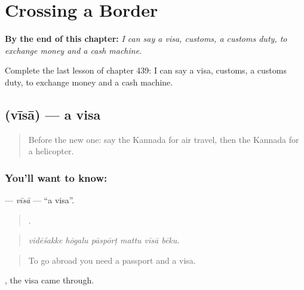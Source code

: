 
\chapter{Crossing a Border}
\label{ch:ka-crossing-a-border}

\begin{chapteropening}
\textbf{By the end of this chapter:} \emph{I can say a visa, customs, a customs duty, to exchange money and a cash machine.}

Complete the last lesson of chapter 439: I can say a visa, customs, a customs duty, to exchange money and a cash machine.
\end{chapteropening}

\section[\texorpdfstring{\kn{ವೀಸಾ} (vīsā)}{ವೀಸಾ (vīsā)}]{ (vīsā) — a visa}

\label{lesson:KA-C439-visa}



\begin{quote}
Before the new one: say the Kannada for air travel, then the Kannada for a helicopter.
\end{quote}

\subsection*{You'll want to know: }
\textbf{} — \emph{vīsā} — \textquotedblleft{}a visa\textquotedblright{}.

\begin{quote}
     .
\end{quote}

\begin{quote}
\emph{vidēśakke hōgalu pāspōrṭ mattu vīsā bēku.}
\end{quote}

\begin{quote}
To go abroad you need a passport and a visa.
\end{quote}

 , the visa came through.


